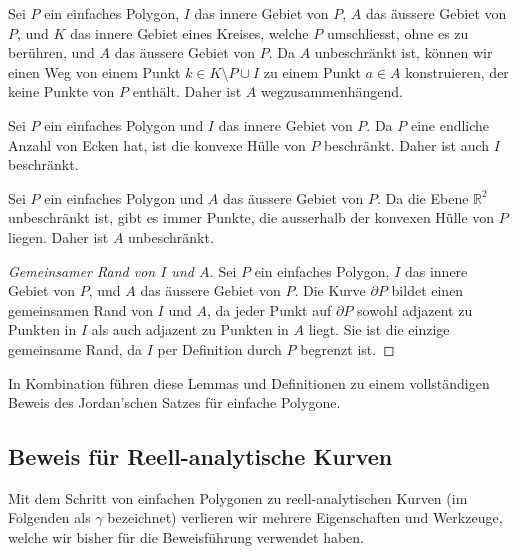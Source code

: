 \begin{lemma}
    Sei $P$ ein einfaches Polygon, $I$ das innere Gebiet von $P$, $A$ das äussere Gebiet von $P$, und $K$ das innere Gebiet eines Kreises, welche $P$ umschliesst, ohne es zu berühren, und $A$ das äussere Gebiet von $P$. 
    Da $A$ unbeschränkt ist, können wir einen Weg von einem Punkt $k \in K \setminus P \cup I$ zu einem Punkt $a \in A$ konstruieren, der keine Punkte von $P$ enthält. 
    Daher ist $A$ wegzusammenhängend.
\end{lemma}

\begin{lemma}
    Sei $P$ ein einfaches Polygon und $I$ das innere Gebiet von $P$. 
    Da $P$ eine endliche Anzahl von Ecken hat, ist die konvexe Hülle von $P$ beschränkt. 
    Daher ist auch $I$ beschränkt.
\end{lemma}

\begin{lemma}
    Sei $P$ ein einfaches Polygon und $A$ das äussere Gebiet von $P$. 
    Da die Ebene $\mathbb{R}^2$ unbeschränkt ist, gibt es immer Punkte, die ausserhalb der konvexen Hülle von $P$ liegen. 
    Daher ist $A$ unbeschränkt.
\end{lemma}



\begin{proof}[Gemeinsamer Rand von $I$ und $A$]
    Sei $P$ ein einfaches Polygon, $I$ das innere Gebiet von $P$, und $A$ das äussere Gebiet von $P$.
    Die Kurve $\partial P$ bildet einen gemeinsamen Rand von $I$ und $A$, da jeder Punkt auf $\partial P$ sowohl adjazent zu Punkten in $I$ als auch adjazent zu Punkten in $A$ liegt.
    Sie ist die einzige gemeinsame Rand, da $I$ per Definition durch $P$ begrenzt ist.
\end{proof}

In Kombination führen diese Lemmas und Definitionen zu einem vollständigen Beweis des Jordan'schen Satzes für einfache Polygone.


\subsection{Beweis für Reell-analytische Kurven}

Mit dem Schritt von einfachen Polygonen zu reell-analytischen Kurven (im Folgenden als $\gamma$ bezeichnet) verlieren wir mehrere Eigenschaften und Werkzeuge, welche wir bisher für die Beweisführung verwendet haben. 

